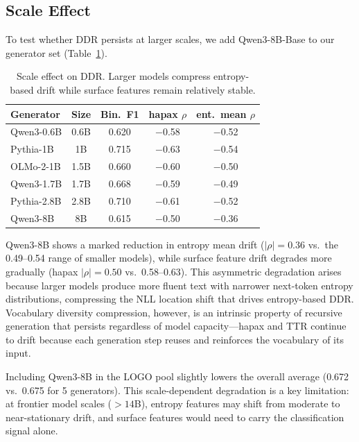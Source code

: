 \documentclass[11pt,a4paper]{article}
\begin{document}
\subsection{Scale Effect}
\label{sec:scale}

To test whether DDR persists at larger scales, we add Qwen3-8B-Base to our generator set (Table~\ref{tab:scale}).

\begin{table}[t]
\centering
\small
\caption{Scale effect on DDR. Larger models compress entropy-based drift while surface features remain relatively stable.}
\label{tab:scale}
\begin{tabular}{lcccc}
\toprule
\textbf{Generator} & \textbf{Size} & \textbf{Bin.\ F1} & \textbf{hapax $\rho$} & \textbf{ent.\ mean $\rho$} \\
\midrule
Qwen3-0.6B & 0.6B & 0.620 & $-$0.58 & $-$0.52 \\
Pythia-1B & 1B & 0.715 & $-$0.63 & $-$0.54 \\
OLMo-2-1B & 1.5B & 0.660 & $-$0.60 & $-$0.50 \\
Qwen3-1.7B & 1.7B & 0.668 & $-$0.59 & $-$0.49 \\
Pythia-2.8B & 2.8B & 0.710 & $-$0.61 & $-$0.52 \\
\midrule
Qwen3-8B & 8B & 0.615 & $-$0.50 & $-$0.36 \\
\bottomrule
\end{tabular}
\end{table}

Qwen3-8B shows a marked reduction in entropy mean drift ($|\rho| = 0.36$ vs.\ the 0.49--0.54 range of smaller models), while surface feature drift degrades more gradually (hapax $|\rho| = 0.50$ vs.\ 0.58--0.63).
This asymmetric degradation arises because larger models produce more fluent text with narrower next-token entropy distributions, compressing the NLL location shift that drives entropy-based DDR.
Vocabulary diversity compression, however, is an intrinsic property of recursive generation that persists regardless of model capacity---hapax and TTR continue to drift because each generation step reuses and reinforces the vocabulary of its input.

Including Qwen3-8B in the LOGO pool slightly lowers the overall average (0.672 vs.\ 0.675 for 5 generators).
This scale-dependent degradation is a key limitation: at frontier model scales ($> 14$B), entropy features may shift from moderate to near-stationary drift, and surface features would need to carry the classification signal alone.
\end{document}
